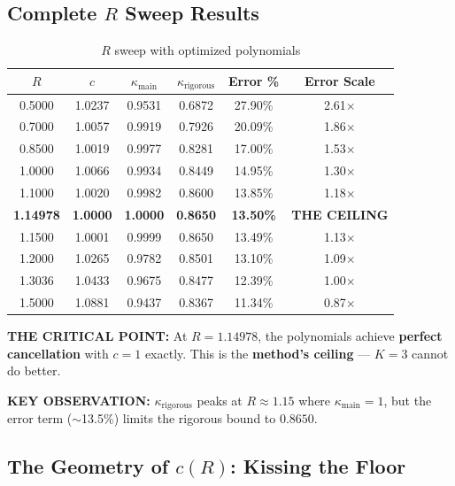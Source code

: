 \documentclass[11pt]{article}
\begin{document}
\subsection{Complete $R$ Sweep Results}

\begin{table}[h]
\centering
\caption{$R$ sweep with optimized polynomials}
\begin{tabular}{cccccc}
\toprule
$R$ & $c$ & $\kappa_{\text{main}}$ & $\kappa_{\text{rigorous}}$ & Error \% & Error Scale \\
\midrule
0.5000 & 1.0237 & 0.9531 & 0.6872 & 27.90\% & 2.61$\times$ \\
0.7000 & 1.0057 & 0.9919 & 0.7926 & 20.09\% & 1.86$\times$ \\
0.8500 & 1.0019 & 0.9977 & 0.8281 & 17.00\% & 1.53$\times$ \\
1.0000 & 1.0066 & 0.9934 & 0.8449 & 14.95\% & 1.30$\times$ \\
1.1000 & 1.0020 & 0.9982 & 0.8600 & 13.85\% & 1.18$\times$ \\
\rowcolor{yellow!30} \textbf{1.14978} & \textbf{1.0000} & \textbf{1.0000} & \textbf{0.8650} & \textbf{13.50\%} & \textbf{THE CEILING} \\
1.1500 & 1.0001 & 0.9999 & 0.8650 & 13.49\% & 1.13$\times$ \\
1.2000 & 1.0265 & 0.9782 & 0.8501 & 13.10\% & 1.09$\times$ \\
1.3036 & 1.0433 & 0.9675 & 0.8477 & 12.39\% & 1.00$\times$ \\
1.5000 & 1.0881 & 0.9437 & 0.8367 & 11.34\% & 0.87$\times$ \\
\bottomrule
\end{tabular}
\end{table}

\textbf{THE CRITICAL POINT:} At $R = 1.14978$, the polynomials achieve \textbf{perfect cancellation} with $c = 1$ exactly. This is the \textbf{method's ceiling} --- $K=3$ cannot do better.

\textbf{KEY OBSERVATION:} $\kappa_{\text{rigorous}}$ peaks at $R \approx 1.15$ where $\kappa_{\text{main}} = 1$, but the error term ($\sim$13.5\%) limits the rigorous bound to $0.8650$.

\subsection{The Geometry of $c(R)$: Kissing the Floor}
\end{document}
